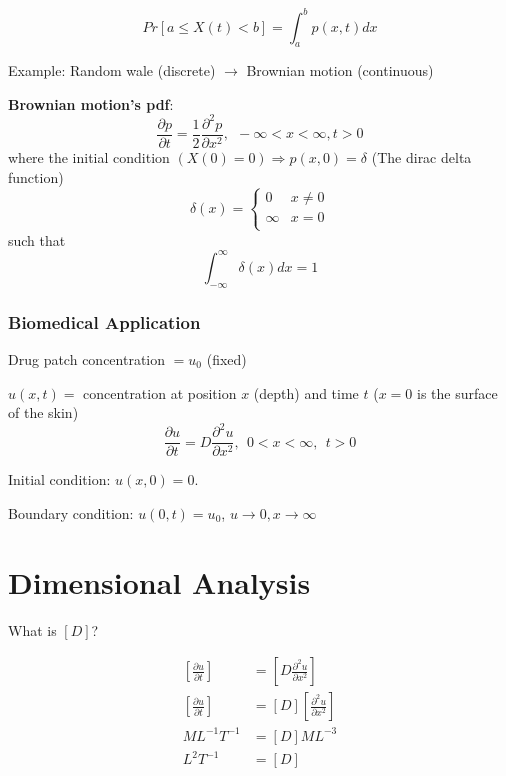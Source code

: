 \documentclass[
	date={September 4{,} 2024}
]{math486notes}
\begin{document}
\begin{equation}
	Pr\left[ a \leq X(t) < b \right] = \int_{a}^{b} p(x,t) dx
	\label{eq:probability-density-function}
\end{equation}

Example: Random wale (discrete) $\rightarrow$ Brownian motion (continuous)

\textbf{Brownian motion's pdf}:
\begin{equation}
	\frac{\partial p}{\partial t} = \frac{1}{2}\frac{\partial^{2} p}{\partial x^{2}},\ \ -\infty < x < \infty, t > 0
	\label{eq:brownian-probability-function}
\end{equation}
where the initial condition $(X(0)=0) \Rightarrow p(x,0) = \delta$ (The dirac delta function)
\[ \delta(x) = \left\{ \begin{array}{cc}
	0 & x\neq 0\\
	\infty & x = 0\\
\end{array} \right. \]
such that
\[ \int_{-\infty}^{\infty} \delta(x)dx = 1 \]


\subsubsection{Biomedical Application}\label{subsubsec:biomedical-application}
Drug patch concentration $=u_{0}$ (fixed)

$u(x,t) = $ concentration at position $x$ (depth) and time $t$ ($x=0$ is the surface of the skin)
\[ \frac{\partial u}{\partial t} = D\frac{\partial^{2}u}{\partial x^{2}},\ \ 0 < x < \infty,\ \ t > 0 \]

Initial condition: $u(x,0) = 0$.

Boundary condition: $u(0, t) = u_{0}$, $u\rightarrow0, x\rightarrow\infty$

\section{Dimensional Analysis}\label{sec:dimensional-analysis}
What is $[D]$?

\begin{equation*}
\begin{aligned}
	\left[ \frac{\partial u}{\partial t} \right] &= \left[ D\frac{\partial^{2}u}{\partial x^{2}} \right]\\
	\left[ \frac{\partial u}{\partial t} \right] &= [D]\left[ \frac{\partial^{2}u}{\partial x^{2}} \right]\\
	ML^{-1}T^{-1} &= [D]ML^{-3}\\
	L^{2}T^{-1} &= [D]\\
\end{aligned}
\end{equation*}
\end{document}
